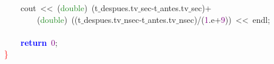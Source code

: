 \mbox{}\ \ \ \ cout\ \textcolor{BrickRed}{\textless{}\textless{}}\ \textcolor{BrickRed}{(}\textcolor{ForestGreen}{double}\textcolor{BrickRed}{)}\ \textcolor{BrickRed}{(}t$\_$despues\textcolor{BrickRed}{.}tv$\_$sec\textcolor{BrickRed}{-}t$\_$antes\textcolor{BrickRed}{.}tv$\_$sec\textcolor{BrickRed}{)+} \\
\mbox{}\ \ \ \ \ \ \ \ \textcolor{BrickRed}{(}\textcolor{ForestGreen}{double}\textcolor{BrickRed}{)}\ \textcolor{BrickRed}{((}t$\_$despues\textcolor{BrickRed}{.}tv$\_$nsec\textcolor{BrickRed}{-}t$\_$antes\textcolor{BrickRed}{.}tv$\_$nsec\textcolor{BrickRed}{)/(}\textcolor{Purple}{1}\textcolor{BrickRed}{.}e\textcolor{BrickRed}{+}\textcolor{Purple}{9}\textcolor{BrickRed}{))}\ \textcolor{BrickRed}{\textless{}\textless{}}\ endl\textcolor{BrickRed}{;} \\
\mbox{}\ \ \ \  \\
\mbox{}\ \ \ \ \textbf{\textcolor{Blue}{return}}\ \textcolor{Purple}{0}\textcolor{BrickRed}{;} \\
\mbox{}\textcolor{Red}{\}}
